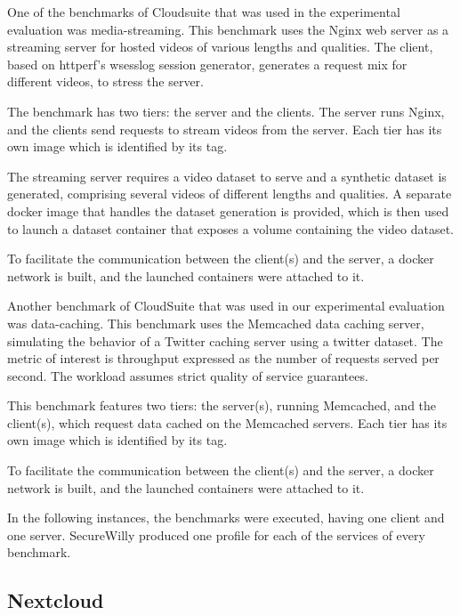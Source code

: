 \begin{description}[style=nextline]
\item[Media Streaming]
One of the benchmarks of Cloudsuite that was used in the experimental evaluation was media-streaming. This benchmark uses the Nginx web server as a streaming server for hosted videos of various lengths and qualities. The client, based on httperf's wsesslog session generator, generates a request mix for different videos, to stress the server. \cite{mediastr}

The benchmark has two tiers: the server and the clients. The server runs Nginx, and the clients send requests to stream videos from the server. Each tier has its own image which is identified by its tag.

The streaming server requires a video dataset to serve and a synthetic dataset is generated, comprising several videos of different lengths and qualities. A separate docker image that handles the dataset generation is provided, which is then used to launch a dataset container that exposes a volume containing the video dataset.

To facilitate the communication between the client(s) and the server, a docker network is built, and the launched containers were attached to it.

\item[Data-Caching]
Another benchmark of CloudSuite that was used in our experimental evaluation was data-caching. This benchmark uses the Memcached data caching server, simulating the behavior of a Twitter caching server using a twitter dataset. The metric of interest is throughput expressed as the number of requests served per second. The workload assumes strict quality of service guarantees. \cite{datacaching}

This benchmark features two tiers: the server(s), running Memcached, and the client(s), which request data cached on the Memcached servers. Each tier has its own image which is identified by its tag.

To facilitate the communication between the client(s) and the server, a docker network is built, and the launched containers were attached to it.
\end{description}

In the following instances, the benchmarks were executed, having one client and one server. SecureWilly produced one profile for each of the services of every benchmark.

\subsection{Nextcloud}

